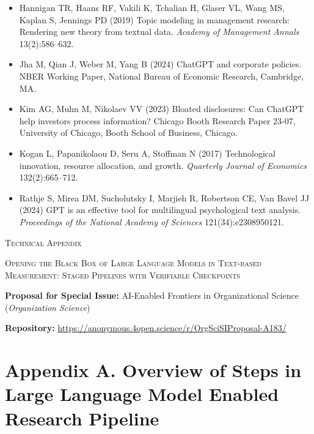 \documentclass[11pt]{article}
\begin{document}
\begin{itemize}
    \item Hannigan TR, Haans RF, Vakili K, Tchalian H, Glaser VL, Wang MS, Kaplan S, Jennings PD (2019) Topic modeling in management research: Rendering new theory from textual data. \textit{Academy of Management Annals} 13(2):586--632.
    \item Jha M, Qian J, Weber M, Yang B (2024) ChatGPT and corporate policies. NBER Working Paper, National Bureau of Economic Research, Cambridge, MA.
    \item Kim AG, Muhn M, Nikolaev VV (2023) Bloated disclosures: Can ChatGPT help investors process information? Chicago Booth Research Paper 23-07, University of Chicago, Booth School of Business, Chicago.
    \item Kogan L, Papanikolaou D, Seru A, Stoffman N (2017) Technological innovation, resource allocation, and growth. \textit{Quarterly Journal of Economics} 132(2):665--712.
    \item Rathje S, Mirea DM, Sucholutsky I, Marjieh R, Robertson CE, Van Bavel JJ (2024) GPT is an effective tool for multilingual psychological text analysis. \textit{Proceedings of the National Academy of Sciences} 121(34):e2308950121.
\end{itemize}


\clearpage
\appendix

\begin{center}
    {\huge \textsc{Technical Appendix}\par}
    \vspace{1.2em}
    {\Large \textsc{Opening the Black Box of Large Language Models in Text-based Measurement: Staged Pipelines with Verifiable Checkpoints}\par}
    \vspace{1em}
    {\footnotesize\textbf{Proposal for Special Issue:} AI-Enabled Frontiers in Organizational Science (\textit{Organization Science})\par}
    \vspace{0.3em}
    {\footnotesize\textbf{Repository:} \url{https://anonymous.4open.science/r/OrgSciSIProposal-A183/}\par}
\end{center}

\vspace{1.5em}

\section*{Appendix A. Overview of Steps in Large Language Model Enabled Research Pipeline}
\end{document}
